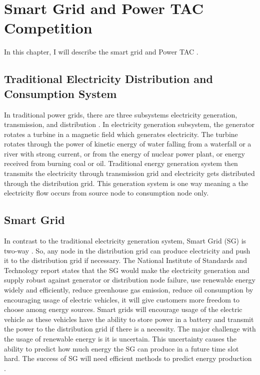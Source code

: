 
\chapter{Smart Grid and Power TAC Competition}

In this chapter, I will describe the smart grid \cite{fang2012smart} and Power TAC \cite{ketter2013power}.

\section{Traditional Electricity Distribution and Consumption System}
In traditional power grids, there are three subsystems electricity generation, transmission, and distribution \cite{fang2012smart}. In electricity generation subsystem, the generator rotates a turbine in a magnetic field which generates electricity. The turbine rotates through the power of kinetic energy of water falling from a waterfall or a river with strong current, or from the energy of nuclear power plant, or energy received from burning coal or oil. Traditional energy generation system then transmits the electricity through transmission grid and electricity gets distributed through the distribution grid. This generation system is one way meaning a the electricity flow occurs from source node to consumption node only.



\section{Smart Grid}
In contrast to the traditional electricity generation system, Smart Grid (SG) is two-way \cite{fang2012smart}. So, any node in the distribution grid can produce electricity and push it to the distribution grid if necessary. The National Institute of Standards and Technology report \cite{fang2012smart} states that the SG would make the electricity generation and supply robust against generator or distribution node failure, use renewable energy widely and efficiently, reduce greenhouse gas emission, reduce oil consumption by encouraging usage of electric vehicles, it will give customers more freedom to choose among energy sources. Smart grids will encourage usage of the electric vehicle as these vehicles have the ability to store power in a battery and transmit the power to the distribution grid if there is a necessity. The major challenge with the usage of renewable energy is it is uncertain. This uncertainty causes the ability to predict how much energy the SG can produce in a future time slot hard. The success of SG will need efficient methods to predict energy production \cite{potter2009building}.


